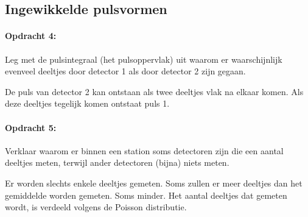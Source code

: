 \subsection{Ingewikkelde pulsvormen}

\begin{minipage}[t]{1\columnwidth}

\paragraph{Opdracht 4:}

Leg met de pulsintegraal (het pulsoppervlak) uit waarom er
waarschijnlijk evenveel deeltjes door detector 1 als door detector
2 zijn gegaan.

De puls van detector 2 kan ontstaan als twee deeltjes vlak na elkaar
komen. Als deze deeltjes tegelijk komen ontstaat puls 1.

\end{minipage}

\begin{minipage}[t]{1\columnwidth}

\paragraph{Opdracht 5:}

Verklaar waarom er binnen een station soms detectoren zijn
die een aantal deeltjes meten, terwijl ander detectoren (bijna) niets
meten.

Er worden slechts enkele deeltjes gemeten. Soms zullen er meer deeltjes
dan het gemiddelde worden gemeten. Soms minder. Het aantal deeltjes
dat gemeten wordt, is verdeeld volgens de Poisson distributie.

\end{minipage}

